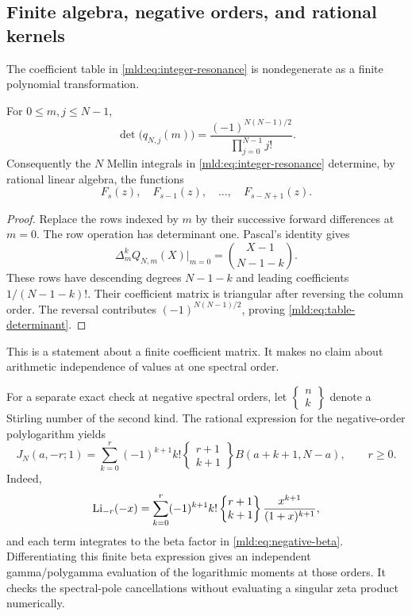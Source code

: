 \subsection{Finite algebra, negative orders, and rational kernels}

The coefficient table in \eqref{mld:eq:integer-resonance} is nondegenerate as a finite polynomial transformation.
\begin{proposition}\label{mld:prop:table-invertible}
For $0\le m,j\le N-1$,
\begin{equation}\label{mld:eq:table-determinant}
 \det\big(q_{N,j}(m)\big)
       =\frac{(-1)^{N(N-1)/2}}{\prod_{j=0}^{N-1}j!}.
\end{equation}
Consequently the $N$ Mellin integrals in \eqref{mld:eq:integer-resonance}
determine, by rational linear algebra, the functions
\[
 F_s(z),\quad F_{s-1}(z),\quad\ldots,\quad F_{s-N+1}(z).
\]
\end{proposition}
\begin{proof}
Replace the rows indexed by $m$ by their successive forward differences at $m=0$. The row operation has determinant one. Pascal's identity gives
\[
 \Delta_m^k Q_{N,m}(X)\big|_{m=0}
       =\binom{X-1}{N-1-k}.
\]
These rows have descending degrees $N-1-k$ and leading coefficients $1/(N-1-k)!$. Their coefficient matrix is triangular after reversing the column order. The reversal contributes $(-1)^{N(N-1)/2}$, proving \eqref{mld:eq:table-determinant}.
\end{proof}
This is a statement about a finite coefficient matrix. It makes no claim about arithmetic independence of values at one spectral order.

For a separate exact check at negative spectral orders, let $\left\{\begin{smallmatrix}n\\k\end{smallmatrix}\right\}$ denote a Stirling number of the second kind. The rational expression for the negative-order polylogarithm yields
\begin{equation}\label{mld:eq:negative-beta}
 J_N(a,-r;1)=\sum_{k=0}^{r}(-1)^{k+1}k!
   \left\{\begin{matrix}r+1\\k+1\end{matrix}\right\}
                     B(a+k+1,N-a),\qquad r\ge0.
\end{equation}
Indeed,
\[
 \operatorname{Li}_{-r}(-x)=\sum_{k=0}^{r}(-1)^{k+1}k!
   \left\{\begin{matrix}r+1\\k+1\end{matrix}\right\}
                  \frac{x^{k+1}}{(1+x)^{k+1}},
\]
and each term integrates to the beta factor in \eqref{mld:eq:negative-beta}. Differentiating this finite beta expression gives an independent gamma/polygamma evaluation of the logarithmic moments at those orders. It checks the spectral-pole cancellations without evaluating a singular zeta product numerically.

